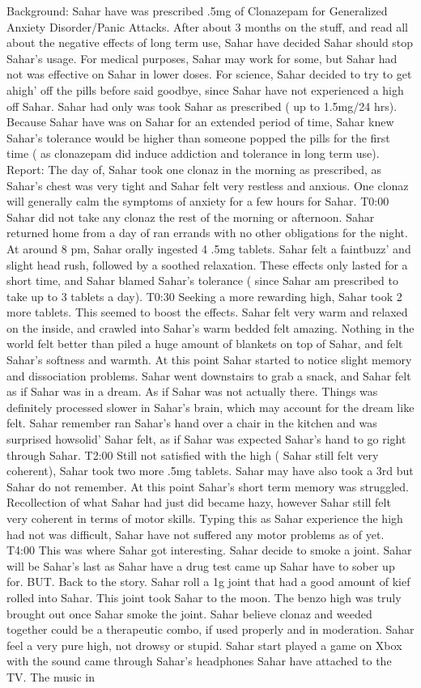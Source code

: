 \documentclass[12pt]{book}
\begin{document}
Background: Sahar have was prescribed .5mg of Clonazepam for Generalized Anxiety Disorder/Panic Attacks. After about 3 months on the stuff, and read all about the negative effects of long term use, Sahar have decided Sahar should stop Sahar's usage. For medical purposes, Sahar may work for some, but Sahar had not was effective on Sahar in lower doses. For science, Sahar decided to try to get ahigh' off the pills before said goodbye, since Sahar have not experienced a high off Sahar. Sahar had only was took Sahar as prescribed ( up to 1.5mg/24 hrs). Because Sahar have was on Sahar for an extended period of time, Sahar knew Sahar's tolerance would be higher than someone popped the pills for the first time ( as clonazepam did induce addiction and tolerance in long term use). Report: The day of, Sahar took one clonaz in the morning as prescribed, as Sahar's chest was very tight and Sahar felt very restless and anxious. One clonaz will generally calm the symptoms of anxiety for a few hours for Sahar. T0:00 Sahar did not take any clonaz the rest of the morning or afternoon. Sahar returned home from a day of ran errands with no other obligations for the night. At around 8 pm, Sahar orally ingested 4 .5mg tablets. Sahar felt a faintbuzz' and slight head rush, followed by a soothed relaxation. These effects only lasted for a short time, and Sahar blamed Sahar's tolerance ( since Sahar am prescribed to take up to 3 tablets a day). T0:30 Seeking a more rewarding high, Sahar took 2 more tablets. This seemed to boost the effects. Sahar felt very warm and relaxed on the inside, and crawled into Sahar's warm bedded felt amazing. Nothing in the world felt better than piled a huge amount of blankets on top of Sahar, and felt Sahar's softness and warmth. At this point Sahar started to notice slight memory and dissociation problems. Sahar went downstairs to grab a snack, and Sahar felt as if Sahar was in a dream. As if Sahar was not actually there. Things was definitely processed slower in Sahar's brain, which may account for the dream like felt. Sahar remember ran Sahar's hand over a chair in the kitchen and was surprised howsolid' Sahar felt, as if Sahar was expected Sahar's hand to go right through Sahar. T2:00 Still not satisfied with the high ( Sahar still felt very coherent), Sahar took two more .5mg tablets. Sahar may have also took a 3rd but Sahar do not remember. At this point Sahar's short term memory was struggled. Recollection of what Sahar had just did became hazy, however Sahar still felt very coherent in terms of motor skills. Typing this as Sahar experience the high had not was difficult, Sahar have not suffered any motor problems as of yet. T4:00 This was where Sahar got interesting. Sahar decide to smoke a joint. Sahar will be Sahar's last as Sahar have a drug test came up Sahar have to sober up for. BUT. Back to the story. Sahar roll a 1g joint that had a good amount of kief rolled into Sahar. This joint took Sahar to the moon. The benzo high was truly brought out once Sahar smoke the joint. Sahar believe clonaz and weeded together could be a therapeutic combo, if used properly and in moderation. Sahar feel a very pure high, not drowsy or stupid. Sahar start played a game on Xbox with the sound came through Sahar's headphones Sahar have attached to the TV. The music in 
\end{document}
